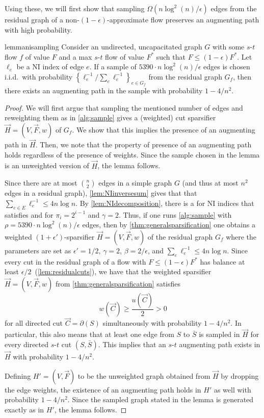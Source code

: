 \documentclass[11pt,a4paper]{article}
\newcommand{\eps}{\epsilon}
\newcommand{\samplesize}{\ensuremath{5390 \cdot n \log^2(n)/\eps}}
\begin{document}
Using these, we will first show that sampling $\Omega(n \log^2(n)/\eps)$ edges from the residual graph of a non-$(1-\eps)$-approximate flow preserves an augmenting path with high probability.

\begin{restatable}{lemma}{nisampling}
\label{lem:nisampling}
Consider an undirected, uncapacitated graph $G$ with some $s$-$t$ flow $f$ of value $F$ and a max $s$-$t$ flow of value  $F^*$ such that $F \le (1-\eps) F^*$. Let $\ell_e$ be a NI index of edge $e$. If a sample of $\samplesize$ edges is chosen i.i.d.~with probability $\left\{ \ell_e^{-1} / \sum_e \ell_e^{-1} \right\}_{e \in G_f}$ from the residual graph $G_f$, then there exists an augmenting path in the sample with probability $1 - 4/n^2$.
\end{restatable}
\begin{proof}
We will first argue that sampling the mentioned number of edges and reweighting them as in \cref{alg:sample} gives a (weighted) cut sparsifier $\vec{H} = (V, \vec{F}, w)$ of $G_f$.
We show that this implies the presence of an augmenting path in $\vec{H}$.
Then, we note that the property of presence of an augmenting path holds regardless of the presence of weights. Since the sample chosen in the lemma is an unweighted version of $\vec{H}$, the lemma follows.

Since there are at most ${\binom n 2}$ edges in a simple graph $G$ (and thus at most $n^2$ edges in a residual graph), \cref{lem:NIinversesum} gives that that $\sum_{e \in E} \ell_e^{-1} \le 4 n \log n$.
By \cref{lem:NIdecomposition}, there is a \decomposition for NI indices that satisfies \piconnectivity and \gammaoverlap for $\pi_i = 2^{i-1}$ and $\gamma = 2$.
Thus, if one runs \cref{alg:sample} with $\rho = \samplesize$ edges, then by \cref{thm:generalsparsification} one obtains a weighted $(1+\eps')$-sparsifier $\vec{H} = (V, \vec{F}, w)$ of the residual graph $G_f$ where the parameters are set as $\eps' = 1/2$, $\gamma = 2$, $\beta = 2/\eps$, and $\sum_e \ell_e^{-1} \le 4 n \log n$. Since every cut in the residual graph of a flow with $F \le (1-\eps) F^* $ has balance at least $\eps/2$~(\cref{lem:residualcuts}), we have that the weighted sparsifier $\vec{H} = (V, \vec{F}, w)$ from \cref{thm:generalsparsification} satisfies
\[
w(\vec{C}) \ge \frac{u(\vec{C})}{2} > 0
\]
for all directed cut $\vec{C} = \partial(S)$ simultaneously with probability $1 - 4/n^2$. In particular, this also means that at least one edge from $S$ to $\bar{S}$ is sampled in $\vec{H}$ for every directed $s$-$t$ cut $(S, \bar{S})$.  This implies that an $s$-$t$ augmenting path exists in $\vec{H}$ with probability $1-4/n^2$.

Defining $H' = (V, \vec{F})$ to be the unweighted graph obtained from $\vec{H}$ by dropping the edge weights, the existence of an augmenting path holds in $H'$ as well with probability $1-4/n^2$.
Since the sampled graph stated in the lemma is generated exactly as in $H'$, the lemma follows.
\end{proof}
\end{document}
